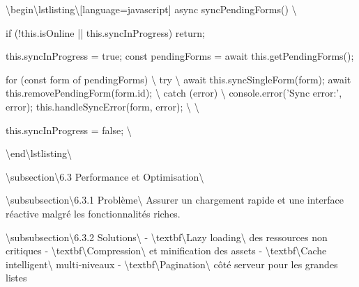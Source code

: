 \documentclass[12pt,a4paper]{report}
\begin{document}
\textbackslash{}begin\textbackslash{}{lstlisting\textbackslash{}}[language=javascript]
async syncPendingForms() \textbackslash{}{
    if (!this.isOnline || this.syncInProgress) return;
    
    this.syncInProgress = true;
    const pendingForms = await this.getPendingForms();
    
    for (const form of pendingForms) \textbackslash{}{
        try \textbackslash{}{
            await this.syncSingleForm(form);
            await this.removePendingForm(form.id);
        \textbackslash{}} catch (error) \textbackslash{}{
            console.error('Sync error:', error);
            this.handleSyncError(form, error);
        \textbackslash{}}
    \textbackslash{}}
    
    this.syncInProgress = false;
\textbackslash{}}
\textbackslash{}end\textbackslash{}{lstlisting\textbackslash{}}

\textbackslash{}subsection\textbackslash{}{6.3 Performance et Optimisation\textbackslash{}}

\textbackslash{}subsubsection\textbackslash{}{6.3.1 Problème\textbackslash{}}
Assurer un chargement rapide et une interface réactive malgré les fonctionnalités riches.

\textbackslash{}subsubsection\textbackslash{}{6.3.2 Solutions\textbackslash{}}
- \textbackslash{}textbf\textbackslash{}{Lazy loading\textbackslash{}} des ressources non critiques
- \textbackslash{}textbf\textbackslash{}{Compression\textbackslash{}} et minification des assets
- \textbackslash{}textbf\textbackslash{}{Cache intelligent\textbackslash{}} multi-niveaux
- \textbackslash{}textbf\textbackslash{}{Pagination\textbackslash{}} côté serveur pour les grandes listes
\end{document}
